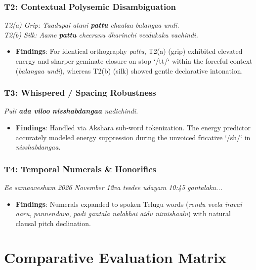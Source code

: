 \documentclass[10pt,twocolumn,a4paper]{article}
\begin{document}
\subsubsection{T2: Contextual Polysemic Disambiguation}
\textit{T2(a) Grip: Taadupai atani \textbf{pattu} chaalaa balangaa undi.}\\
\textit{T2(b) Silk: Aame \textbf{pattu} cheeranu dharinchi veedukaku vachindi.}
\begin{itemize}[noitemsep]
    \item \textbf{Findings}: For identical orthography \textit{pattu}, T2(a) (grip) exhibited elevated energy and sharper geminate closure on stop `/tt/` within the forceful context (\textit{balangaa undi}), whereas T2(b) (silk) showed gentle declarative intonation.
\end{itemize}

\subsubsection{T3: Whispered / Spacing Robustness}
\textit{Puli \textbf{ada viloo} \textbf{nisshabdangaa} nadichindi.}
\begin{itemize}[noitemsep]
    \item \textbf{Findings}: Handled via Akshara sub-word tokenization. The energy predictor accurately modeled energy suppression during the unvoiced fricative `/sh/` in \textit{nisshabdangaa}.
\end{itemize}

\subsubsection{T4: Temporal Numerals \& Honorifics}
\textit{Ee samaavesham 2026 November 12va teedee udayam 10:45 gantalaku...}
\begin{itemize}[noitemsep]
    \item \textbf{Findings}: Numerals expanded to spoken Telugu words (\textit{rendu veela iravai aaru}, \textit{pannendava}, \textit{padi gantala nalabhai aidu nimishaalu}) with natural clausal pitch declination.
\end{itemize}

\section{Comparative Evaluation Matrix}
\end{document}

